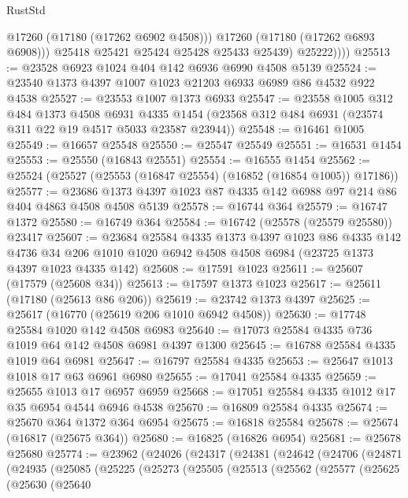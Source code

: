 \begin{lexlean}{RustStd}
\begin{coremodule}
{\begin{coremodule}
{{{{{{{{{{{{{{{{{{{{{{{{{{{{{{{{{{{{{{{{{{{{{{{{{{{{{{{                  @17260
                  (@17180 (@17262 @6902 @4508)))
                @17260
                (@17180 (@17262 @6893 @6908)))
              @25418
              @25421
              @25424
              @25428
              @25433
              @25439)
            @25222))))
@25513 := @23528 @6923 @1024 @404 @142 @6936 @6990 @4508 @5139
@25524 := @23540 @1373 @4397 @1007 @1023 @21203 @6933 @6989 @86 @4532 @922 @4538
@25527 := @23553 @1007 @1373 @6933
@25547 := @23558
    @1005
    @312
    @484
    @1373
    @4508
    @6931
    @4335
    @1454
    (@23568 @312 @484 @6931 (@23574 @311 @22 @19 @4517 @5033 @23587 @23944))
@25548 := @16461 @1005
@25549 := @16657 @25548
@25550 := @25547 @25549
@25551 := @16531 @1454
@25553 := @25550 (@16843 @25551)
@25554 := @16555 @1454
@25562 := @25524 (@25527 (@25553 (@16847 @25554) (@16852 (@16854 @1005)) @17186))
@25577 := @23686 @1373 @4397 @1023 @87 @4335 @142 @6988 @97 @214 @86 @404 @4863 @4508 @4508 @5139
@25578 := @16744 @364
@25579 := @16747 @1372
@25580 := @16749 @364
@25584 := @16742 (@25578 (@25579 @25580)) @23417
@25607 := @23684
    @25584
    @4335
    @1373
    @4397
    @1023
    @86
    @4335
    @142
    @4736
    @34
    @206
    @1010
    @1020
    @6942
    @4508
    @4508
    @6984
    (@23725 @1373 @4397 @1023 @4335 @142)
@25608 := @17591 @1023
@25611 := @25607 (@17579 (@25608 @34))
@25613 := @17597 @1373 @1023
@25617 := @25611 (@17180 (@25613 @86 @206))
@25619 := @23742 @1373 @4397
@25625 := @25617 (@16770 (@25619 @206 @1010 @6942 @4508))
@25630 := @17748 @25584 @1020 @142 @4508 @6983
@25640 := @17073 @25584 @4335 @736 @1019 @64 @142 @4508 @6981 @4397 @1300
@25645 := @16788 @25584 @4335 @1019 @64 @6981
@25647 := @16797 @25584 @4335
@25653 := @25647 @1013 @1018 @17 @63 @6961 @6980
@25655 := @17041 @25584 @4335
@25659 := @25655 @1013 @17 @6957 @6959
@25668 := @17051 @25584 @4335 @1012 @17 @35 @6954 @4544 @6946 @4538
@25670 := @16809 @25584 @4335
@25674 := @25670 @364 @1372 @364 @6954
@25675 := @16818 @25584
@25678 := @25674 (@16817 (@25675 @364))
@25680 := @16825 (@16826 @6954)
@25681 := @25678 @25680
@25774 := @23962
    (@24026
      (@24317
        (@24381
          (@24642
            (@24706
              (@24871
                (@24935
                  (@25085
                    (@25225
                      (@25273
                        (@25505
                          (@25513
                            (@25562
                              (@25577
                                (@25625
                                  (@25630
                                    (@25640
}}}}}}}}}}}}}}}}}}}}}}}}}}}}}}}}}}}}}}}}}}}}}}}}}}}}}}}
\end{coremodule}}
\end{coremodule}
\end{lexlean}
